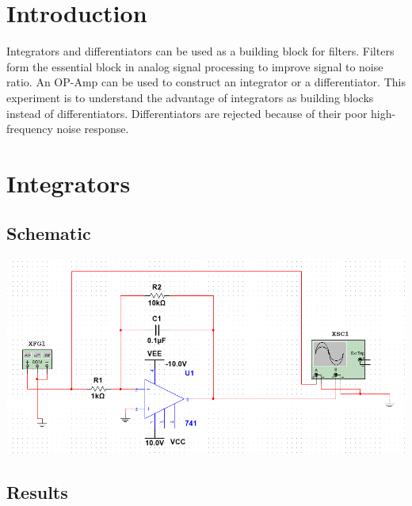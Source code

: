 \documentclass[a4paper, 12pt, english]{article}
\newenvironment{Figure}
  {\par\medskip\noindent\minipage{\linewidth}}
  {\endminipage\par\medskip}
\begin{document}


\newpage
\section{Introduction}
Integrators and differentiators can be used as a building block for filters. Filters form the essential block in analog signal processing to improve signal to noise ratio. An OP-Amp can be used to construct an integrator or a differentiator. This experiment is to understand the advantage of integrators as building blocks instead of differentiators. Differentiators are rejected because of their poor high-frequency noise response.
\newline

\section{Integrators}
\subsection{Schematic}
\begin{Figure}
 \centering
 \includegraphics[width=1.2\linewidth, scale=2]{images/intg circuit.png}
\end{Figure}


\subsection{Results}
\end{document}
